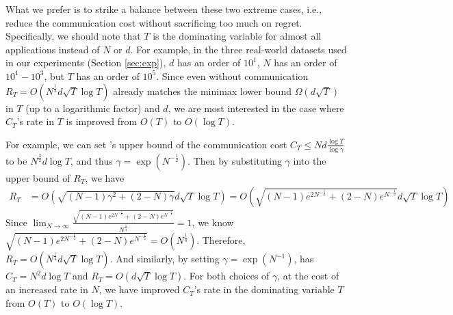 What we prefer is to strike a balance between these two extreme cases, i.e., reduce the communication cost without sacrificing too much on regret. Specifically, we should note that $T$ is the dominating variable for almost all applications instead of $N$ or $d$. For example, in the three real-world datasets used in our experiments (Section \ref{sec:exp}), $d$ has an order of $10^{1}$, $N$ has an order of $10^{1}-10^{3}$, but $T$ has an order of $10^{5}$. Since even without communication $R_{T}=O(N^{\frac{1}{2}}d\sqrt{T}\log{T})$ already matches the minimax lower bound $\Omega(d\sqrt{T})$ in $T$ (up to a logarithmic factor) and $d$, we are most interested in the case where $C_{T}$'s rate in $T$ is improved from $O(T)$ to $O(\log{T})$. 

For example, we can set \modelone{}'s upper bound of the communication cost $C_{T} \leq N d \frac{\log{T}}{\log{\gamma}}$ to be $N^{\frac{3}{2}} d \log{T}$, and thus $\gamma=\exp(N^{-\frac{1}{2}})$. Then by substituting $\gamma$ into the upper bound of $R_{T}$, we have 
\begin{align*}
R_{T} &=O\left(\sqrt{(N-1)\gamma^{2}+(2-N)\gamma}d \sqrt{T} \log{T}\right)  = O\left(\sqrt{(N-1)e^{2 N^{-\frac{1}{2}}}+(2-N)e^{N^{-\frac{1}{2}}}}d \sqrt{T} \log{T}\right) 
\end{align*}
Since $\lim_{N \rightarrow \infty} \frac{\sqrt{(N-1)e^{2 N^{-\frac{1}{2}}}+(2-N)e^{N^{-\frac{1}{2}}}}}{N^{\frac{1}{4}}}=1$, we know $\sqrt{(N-1)e^{2 N^{-\frac{1}{2}}}+(2-N)e^{N^{-\frac{1}{2}}}}=O(N^{\frac{1}{4}})$. Therefore, $R_{T}=O(N^{\frac{1}{4}}d \sqrt{T} \log{T})$. And similarly, by setting $\gamma=\exp(N^{-1})$, \modelone{} has $C_{T}=N^{2}d\log{T}$ and $R_{T}=O(d\sqrt{T}\log{T})$. For both choices of $\gamma$, at the cost of an increased rate in $N$, we have improved $C_{T}$'s rate in the dominating variable $T$ from $O(T)$ to $O(\log{T})$.



